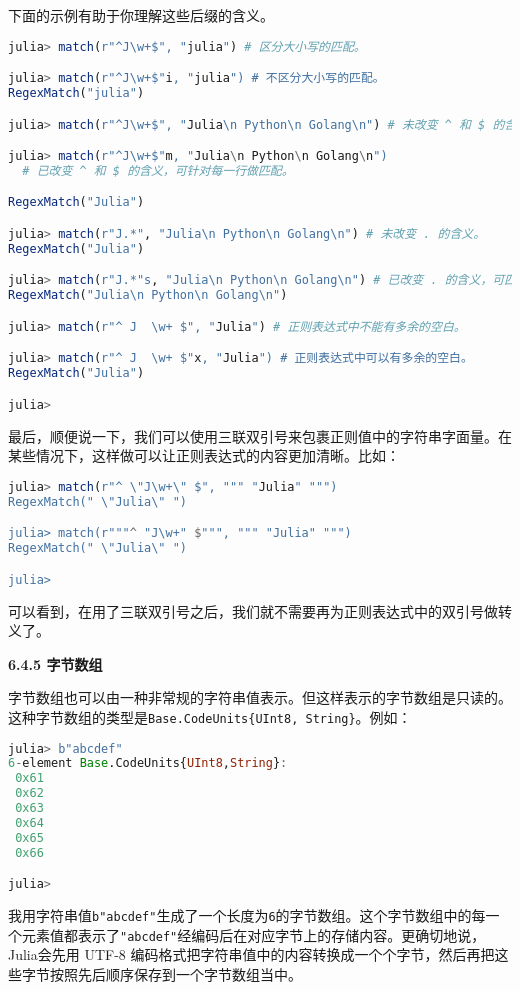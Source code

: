 下面的示例有助于你理解这些后缀的含义。
\begin{lstlisting}[language=julia]
julia> match(r"^J\w+$", "julia") # 区分大小写的匹配。

julia> match(r"^J\w+$"i, "julia") # 不区分大小写的匹配。
RegexMatch("julia")

julia> match(r"^J\w+$", "Julia\n Python\n Golang\n") # 未改变 ^ 和 $ 的含义。

julia> match(r"^J\w+$"m, "Julia\n Python\n Golang\n") 
  # 已改变 ^ 和 $ 的含义，可针对每一行做匹配。

RegexMatch("Julia")

julia> match(r"J.*", "Julia\n Python\n Golang\n") # 未改变 . 的含义。
RegexMatch("Julia")

julia> match(r"J.*"s, "Julia\n Python\n Golang\n") # 已改变 . 的含义，可匹配换行。
RegexMatch("Julia\n Python\n Golang\n")

julia> match(r"^ J  \w+ $", "Julia") # 正则表达式中不能有多余的空白。

julia> match(r"^ J  \w+ $"x, "Julia") # 正则表达式中可以有多余的空白。
RegexMatch("Julia")

julia> 
\end{lstlisting}

最后，顺便说一下，我们可以使用三联双引号来包裹正则值中的字符串字面量。在某些情况下，这样做可以让正则表达式的内容更加清晰。比如：
\begin{lstlisting}[language=julia]
julia> match(r"^ \"J\w+\" $", """ "Julia" """)
RegexMatch(" \"Julia\" ")

julia> match(r"""^ "J\w+" $""", """ "Julia" """)
RegexMatch(" \"Julia\" ")

julia> 
\end{lstlisting}

可以看到，在用了三联双引号之后，我们就不需要再为正则表达式中的双引号做转义了。

\textbf{6.4.5 字节数组}

字节数组也可以由一种非常规的字符串值表示。但这样表示的字节数组是只读的。这种字节数组的类型是\verb`Base.CodeUnits{UInt8, String}`。例如：
\begin{lstlisting}[language=julia]
julia> b"abcdef"
6-element Base.CodeUnits{UInt8,String}:
 0x61
 0x62
 0x63
 0x64
 0x65
 0x66

julia>
\end{lstlisting}

我用字符串值\verb`b"abcdef"`生成了一个长度为\verb`6`的字节数组。这个字节数组中的每一个元素值都表示了\verb`"abcdef"`经编码后在对应字节上的存储内容。更确切地说，Julia会先用 UTF-8 编码格式把字符串值中的内容转换成一个个字节，然后再把这些字节按照先后顺序保存到一个字节数组当中。

